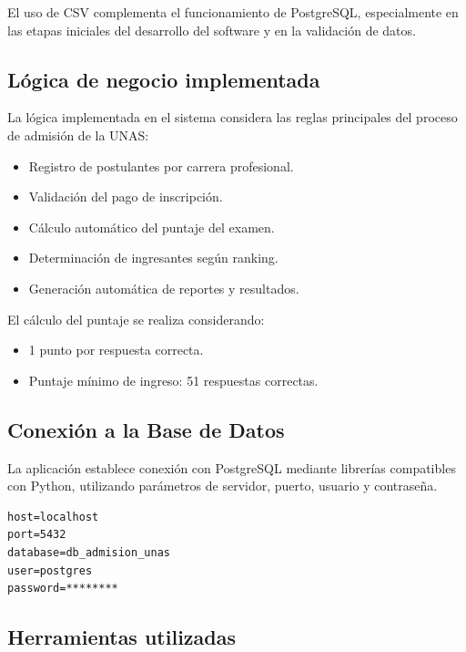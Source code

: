\documentclass[12pt, a4paper]{report}
\begin{document}
El uso de CSV complementa el funcionamiento de PostgreSQL, especialmente en las etapas iniciales del desarrollo del software y en la validación de datos.

\subsection{Lógica de negocio implementada}

La lógica implementada en el sistema considera las reglas principales del proceso de admisión de la UNAS:

\begin{itemize}[noitemsep]
  \item Registro de postulantes por carrera profesional.
  
  \item Validación del pago de inscripción.
  
  \item Cálculo automático del puntaje del examen.
  
  \item Determinación de ingresantes según ranking.
  
  \item Generación automática de reportes y resultados.
\end{itemize}

El cálculo del puntaje se realiza considerando:

\begin{itemize}[noitemsep]
  \item 1 punto por respuesta correcta.
  
  \item Puntaje mínimo de ingreso: 51 respuestas correctas.
\end{itemize}

\subsection{Conexión a la Base de Datos}

La aplicación establece conexión con PostgreSQL mediante librerías compatibles con Python, utilizando parámetros de servidor, puerto, usuario y contraseña.

\begin{verbatim}
host=localhost
port=5432
database=db_admision_unas
user=postgres
password=********
\end{verbatim}

\subsection{Herramientas utilizadas}
\end{document}
